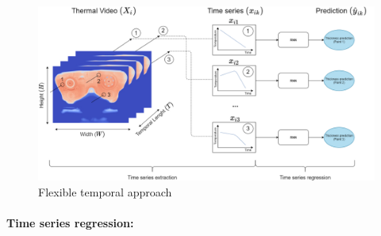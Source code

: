 \begin{figure}
\centering
\includegraphics[scale=0.4]{images/chapter_4/Flexible_Temporal.png}
\caption{Flexible temporal approach}
\label{fig:temporal_approach}
\end{figure}

\paragraph{Time series regression:}

